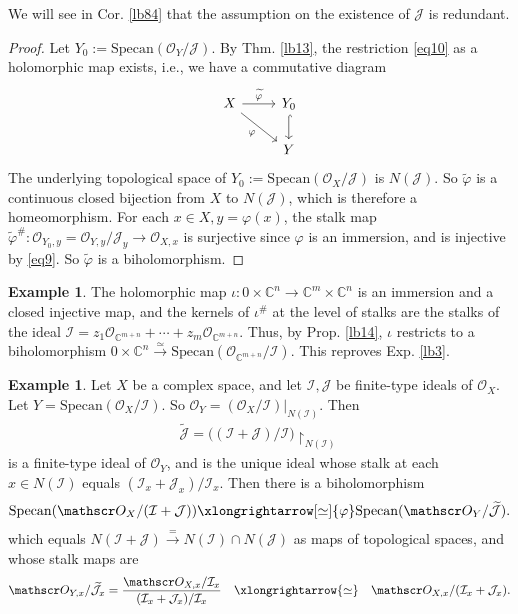 \documentclass[12pt,b5paper,notitlepage]{report}
\theoremstyle{definition}
\newtheorem{eg}[df]{Example}
\theoremstyle{plain}
\newcommand{\mc}{\mathcal}
\newcommand{\wtd}{\widetilde}
\newcommand{\scr}{\mathscr}
\newcommand{\Cbb}{\mathbb C}
\newcommand{\Specan}{\mathrm{Specan}}
\newcommand{\uph}{\upharpoonright}
\numberwithin{equation}{section}
\begin{document}
We will see in Cor. \ref{lb84} that the assumption on the existence of $\mc J$ is redundant.






\begin{proof}
Let $Y_0:=\Specan(\scr O_Y/\mc J)$. By Thm. \ref{lb13}, the restriction \eqref{eq10} as a holomorphic map exists, i.e., we have a commutative diagram
\begin{equation*}
\begin{tikzcd}
X \arrow[r, "\wtd\varphi"] \arrow[rd, "\varphi"'] & Y_0 \arrow[d, hook] \\
                                  & Y                
\end{tikzcd}
\end{equation*}
The underlying topological space of $Y_0:=\Specan(\scr O_X/\mc J)$ is $N(\mc J)$. So $\wtd\varphi$ is a continuous closed bijection from $X$ to $N(\mc J)$, which is therefore a homeomorphism. For each $x\in X,y=\varphi(x)$, the stalk map $\wtd\varphi^\#:\scr O_{Y_0,y}=\scr O_{Y,y}/\mc J_y\rightarrow\scr O_{X,x}$ is surjective since $\varphi$ is an immersion, and is injective by \eqref{eq9}. So $\wtd\varphi$ is a biholomorphism.
\end{proof}



\begin{eg}\label{lb22}
The holomorphic map $\iota:0\times\Cbb^n\rightarrow\Cbb^m\times\Cbb^n$ is an immersion and a closed injective map, and the kernels of $\iota^\#$ at the level  of stalks are the stalks of the ideal $\mc I=z_1\scr O_{\Cbb^{m+n}}+\cdots+ z_m\scr O_{\Cbb^{m+n}}$. Thus, by Prop. \ref{lb14}, $\iota$ restricts to a biholomorphism $0\times\Cbb^n\xrightarrow{\simeq}\Specan(\scr O_{\Cbb^{m+n}}/\mc I)$. This reproves Exp. \ref{lb3}.
\end{eg}



\begin{eg}\label{lb23}
Let $X$ be a complex space, and let $\mc I,\mc J$ be finite-type ideals of $\scr O_X$. Let $Y=\Specan(\scr O_X/\mc I)$. So $\scr O_Y=(\scr O_X/\mc I)|_{N(\mc I)}$. Then
\begin{align*}
\wtd {\mc J}=\big((\mc I+\mc J)/\mc I\big)\uph_{N(\mc I)}
\end{align*}
is a finite-type ideal of $\scr O_Y$, and is the unique ideal whose stalk at each $x\in N(\mc I)$ equals $(\mc I_x+\mc J_x)/\mc I_x$. Then there is a biholomorphism
\begin{align}
\Specan(\scr O_X/(\mc I+\mc J))\xlongrightarrow[\simeq]{\varphi} \Specan(\scr O_Y/\wtd{\mc J}).
\end{align}
which equals $N(\mc I+\mc J)\xrightarrow{=}N(\mc I)\cap N(\mc J)$ as maps of topological spaces, and whose stalk maps are
\begin{align*}
\scr O_{Y,x}/\wtd{\mc J}_x=\frac{\scr O_{X,x}/\mc I_x}{(\mc I_x+\mc J_x)/\mc I_x}\quad\xlongrightarrow{\simeq}\quad\scr O_{X,x}/(\mc I_x+\mc J_x).
\end{align*}
\end{eg}
\end{document}
